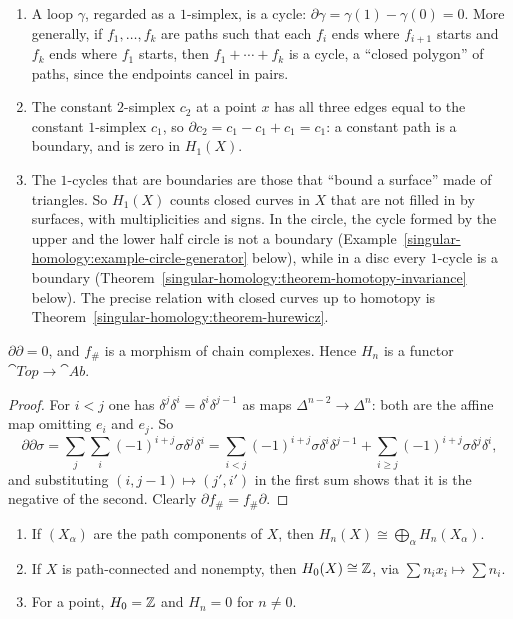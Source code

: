\begin{example}\label{singular-homology:example-cycles}
\begin{enumerate}
\item A loop $\gamma$, regarded as a $1$-simplex, is a cycle: $\partial\gamma = \gamma(1) - \gamma(0) = 0$. More generally, if $f_1, \ldots, f_k$ are paths such that each
$f_i$ ends where $f_{i+1}$ starts and $f_k$ ends where $f_1$ starts, then $f_1 + \cdots + f_k$ is a cycle, a ``closed polygon'' of paths, since the endpoints cancel
in pairs.
\item The constant $2$-simplex $c_2$ at a point $x$ has all three edges equal to the constant $1$-simplex $c_1$, so $\partial c_2 = c_1 - c_1 + c_1 = c_1$: a constant
path is a boundary, and is zero in $H_1(X)$.
\item The $1$-cycles that are boundaries are those that ``bound a surface'' made of triangles. So $H_1(X)$ counts closed curves in $X$ that are not filled in by
surfaces, with multiplicities and signs. In the circle, the cycle formed by the upper and the lower half circle is not a boundary
(Example~\ref{singular-homology:example-circle-generator} below), while in a disc every $1$-cycle is a boundary
(Theorem~\ref{singular-homology:theorem-homotopy-invariance} below). The precise relation with closed curves up to homotopy is
Theorem~\ref{singular-homology:theorem-hurewicz}.
\end{enumerate}
\end{example}

\begin{lemma}\label{singular-homology:lemma-boundary-squared}
$\partial\partial = 0$, and $f_\#$ is a morphism of chain complexes. Hence $H_n$ is a functor $\cat{Top} \to \cat{Ab}$.
\end{lemma}

\begin{proof}
For $i < j$ one has $\delta^j\delta^i = \delta^i\delta^{j-1}$ as maps $\Delta^{n-2} \to \Delta^n$: both are the affine map omitting $e_i$ and $e_j$. So
\[
\partial\partial\sigma = \sum_{j}\sum_{i} (-1)^{i+j}\sigma\delta^j\delta^i
= \sum_{i < j} (-1)^{i+j}\sigma\delta^i\delta^{j-1} + \sum_{i \geq j}(-1)^{i+j}\sigma\delta^j\delta^i,
\]
and substituting $(i, j - 1) \mapsto (j', i')$ in the first sum shows that it is the negative of the second. Clearly $\partial f_\# = f_\#\partial$.
\end{proof}

\begin{proposition}\label{singular-homology:proposition-h0-point}
\begin{enumerate}
\item If $(X_\alpha)$ are the path components of $X$, then $H_n(X) \cong \bigoplus_\alpha H_n(X_\alpha)$.
\item If $X$ is path-connected and nonempty, then $H_0(X) \cong \mathbb{Z}$, via $\sum n_ix_i \mapsto \sum n_i$.
\item For a point, $H_0 = \mathbb{Z}$ and $H_n = 0$ for $n \neq 0$.
\end{enumerate}
\end{proposition}


